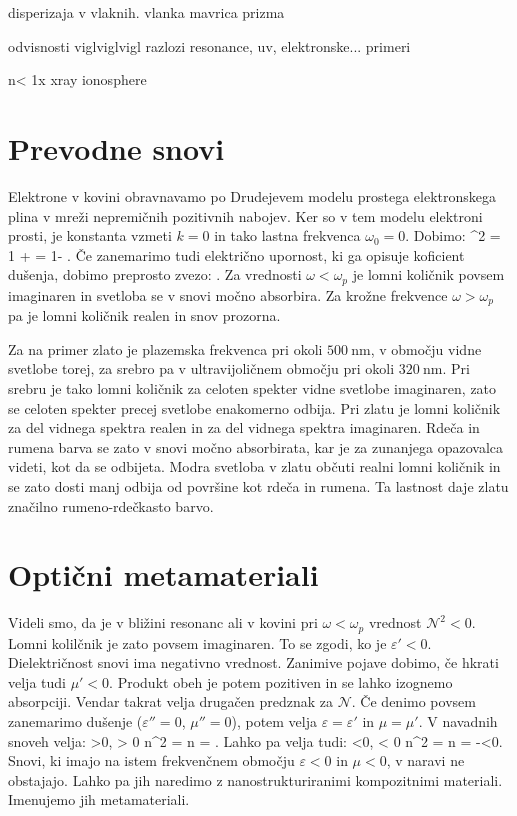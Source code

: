 disperizaja v vlaknih.
vlanka
mavrica
prizma

odvisnosti
viglviglvigl razlozi resonance, uv, elektronske... 
primeri

n< 1x xray ionosphere


\section{Prevodne snovi}
Elektrone v kovini obravnavamo po Drudejevem modelu prostega elektronskega plina
v mreži nepremičnih pozitivnih nabojev. Ker so v tem modelu elektroni prosti,
je konstanta vzmeti $k=0$ in tako lastna frekvenca $\omega_0=0$. Dobimo:
\beq
{}^2 = 1 +  = 1- 
.
\label{eq:09_36}
\eeq
Če zanemarimo tudi električno upornost, ki ga opisuje koficient dušenja, dobimo
preprosto zvezo:
\beq
{} \approx {}.
\label{eq:09_37}
\eeq
Za vrednosti $\omega < \omega_p$ je lomni količnik povsem imaginaren in svetloba se v snovi
močno absorbira. Za krožne frekvence $\omega > \omega_p$ pa je lomni količnik realen 
in snov prozorna. 

Za na primer zlato je plazemska frekvenca pri okoli $500~\si{\nano\meter}$, v območju
vidne svetlobe torej, za srebro pa v ultravijoličnem območju pri okoli $320~\si{\nano\meter}$. 
Pri srebru je tako lomni količnik za celoten spekter vidne svetlobe imaginaren, zato se celoten 
spekter precej svetlobe enakomerno odbija. Pri zlatu je lomni količnik za del vidnega spektra realen in za
del vidnega spektra imaginaren. Rdeča in rumena barva se zato v snovi močno absorbirata, kar
je za zunanjega opazovalca videti, kot da se odbijeta. Modra svetloba v zlatu občuti
realni lomni količnik in se zato dosti manj odbija od površine kot rdeča in rumena. Ta
lastnost daje zlatu značilno rumeno-rdečkasto barvo. 


\section{Optični metamateriali}
Videli smo, da je v bližini resonanc ali v kovini pri $\omega <\omega_p$ vrednost $\mathcal{N}^2 <0$.
Lomni kolilčnik je zato povsem imaginaren. To se zgodi, ko je $\varepsilon'<0$. Dielektričnost
snovi ima negativno vrednost. Zanimive pojave dobimo, če hkrati velja tudi $\mu'<0$. Produkt
obeh je potem pozitiven in se lahko izognemo absorpciji. Vendar takrat velja drugačen
predznak za $\mathcal{N}$. Če denimo povsem zanemarimo dušenje ($\varepsilon''=0$, $\mu''=0$), 
potem velja $\varepsilon=\varepsilon'$ in $\mu  = \mu'$.
V navadnih snoveh velja:
\beq
\varepsilon >0, \mu > 0 \qquad \Rightarrow \qquad n^2 = \varepsilon \mu 
\qquad \Rightarrow \qquad n = \sqrt{\varepsilon\mu}. 
\label{eq:09_37m}
\eeq
Lahko pa velja tudi:
\beq
\varepsilon <0, \mu < 0 \qquad \Rightarrow \qquad n^2 = \varepsilon \mu 
\qquad \Rightarrow \qquad n = -\sqrt{\varepsilon\mu}<0. 
\label{eq:09_38}
\eeq
Snovi, ki imajo na istem frekvenčnem območju $\varepsilon<0$ in $\mu<0$, v naravi ne 
obstajajo. Lahko pa jih naredimo z nanostrukturiranimi kompozitnimi materiali. Imenujemo
jih metamateriali. 


